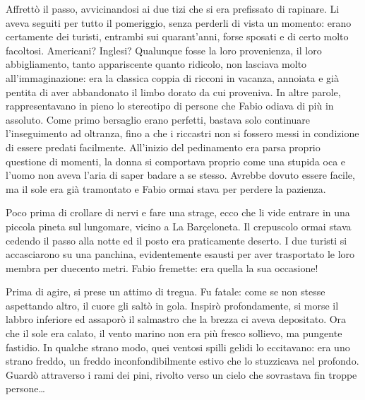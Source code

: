 Affrettò il passo, avvicinandosi ai due tizi che si era prefissato di rapinare. Li aveva seguiti per tutto il pomeriggio, senza perderli di vista un momento: erano certamente dei turisti, entrambi sui quarant'anni, forse sposati e di certo molto facoltosi. Americani? Inglesi? Qualunque fosse la loro provenienza, il loro abbigliamento, tanto appariscente quanto ridicolo, non lasciava molto all'immaginazione: era la classica coppia di ricconi in vacanza, annoiata e già pentita di aver abbandonato il limbo dorato da cui proveniva. In altre parole, rappresentavano in pieno lo stereotipo di persone che Fabio odiava di più in assoluto. Come primo bersaglio erano perfetti, bastava solo continuare l'inseguimento ad oltranza, fino a che i riccastri non si fossero messi in condizione di essere predati facilmente. All'inizio del pedinamento era parsa proprio questione di momenti, la donna si comportava proprio come una stupida oca e l'uomo non aveva l'aria di saper badare a se stesso. Avrebbe dovuto essere facile, ma il sole era già tramontato e Fabio ormai stava per perdere la pazienza.

Poco prima di crollare di nervi e fare una strage, ecco che li vide entrare in una piccola pineta sul lungomare, vicino a La Barçeloneta. Il crepuscolo ormai stava cedendo il passo alla notte ed il posto era praticamente deserto. I due turisti si accasciarono su una panchina, evidentemente esausti per aver trasportato le loro membra per duecento metri. Fabio fremette: era quella la sua occasione!

Prima di agire, si prese un attimo di tregua. Fu fatale: come se non stesse aspettando altro, il cuore gli saltò in gola. Inspirò profondamente, si morse il labbro inferiore ed assaporò il salmastro che la brezza ci aveva depositato. Ora che il sole era calato, il vento marino non era più fresco sollievo, ma pungente fastidio. In qualche strano modo, quei ventosi spilli gelidi lo eccitavano: era uno strano freddo, un freddo inconfondibilmente estivo che lo stuzzicava nel profondo. Guardò attraverso i rami dei pini, rivolto verso un cielo che sovrastava fin troppe persone\ldots

